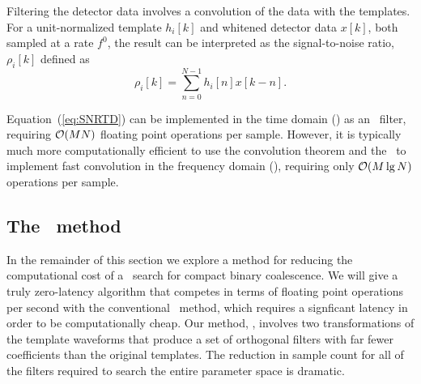 Filtering the detector data involves a convolution of the data with the
templates.  For a unit-normalized template $h_i[k]$ and whitened detector data
$x[k]$, both sampled at a rate $f^0$, the result can be interpreted as the
signal-to-noise ratio, $\rho_i[k]$ defined as
%
%
\begin{equation}
	\label{eq:SNRTD}
	\rho_i [k] = \sum_{n=0}^{N-1} h_{i}[n] x [k-n].
\end{equation}

Equation~(\ref{eq:SNRTD}) can be implemented in the time domain (\TD) as an
\fir\ filter, requiring $\mathcal O(M N)$ floating point
operations per sample.  However, it is typically much more computationally
efficient to use the convolution theorem and the \fft\ to implement fast
convolution in the frequency domain (\FD), requiring only $\mathcal O(M
\lg N)$ operations per sample.


\subsection{The \lloid\ method}

In the remainder of this section we explore a method for reducing the
computational cost of a \TD\ search for compact binary coalescence.  We will
give a truly zero-latency algorithm that competes in terms of floating point
operations per second with the conventional \FD\ method, which requires a
signficant latency in order to be computationally cheap. Our method, \lloid{},
involves two transformations of the template waveforms that produce a set of
orthogonal filters with far fewer coefficients than the original templates.
The reduction in sample count for all of the filters required to search the
entire parameter space is dramatic.

